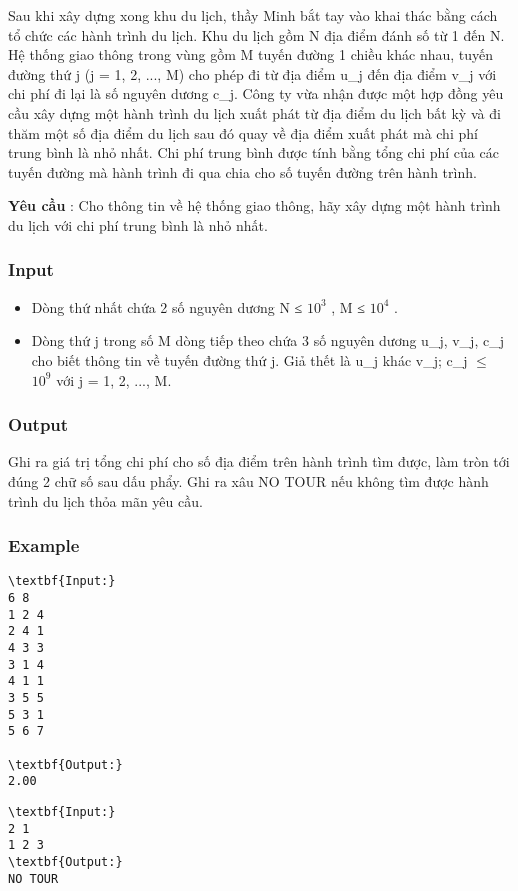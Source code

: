 



   Sau khi xây dựng xong khu du lịch, thầy Minh bắt tay vào khai thác bằng cách tổ chức các hành trình du lịch. Khu du lịch gồm N địa điểm đánh số từ 1 đến N. Hệ thống giao thông trong vùng gồm M tuyến đường 1 chiều khác nhau, tuyến đường thứ j (j = 1, 2, ..., M) cho phép đi từ địa điểm u\_j đến địa điểm v\_j với chi phí đi lại là số nguyên dương c\_j. Công ty vừa nhận được một hợp đồng yêu cầu xây dựng một hành trình du lịch xuất phát từ địa điểm du lịch bất kỳ và đi thăm một số địa điểm du lịch sau đó quay về địa điểm xuất phát mà chi phí trung bình là nhỏ nhất. Chi phí trung bình được tính bằng tổng chi phí của các tuyến đường mà hành trình đi qua chia cho số tuyến đường trên hành trình.  

\textbf{    Yêu cầu   }   : Cho thông tin về hệ thống giao thông, hãy xây dựng một hành trình du lịch với chi phí trung bình là nhỏ nhất.  

\subsubsection{   Input  }
\begin{itemize}
	\item     Dòng thứ nhất chứa 2 số nguyên dương N ≤ $10^{3}$    , M         ≤ $10^{4}$     .    
	\item      Dòng thứ j trong số M dòng tiếp theo chứa 3 số nguyên dương u\_j, v\_j, c\_j cho biết thông tin về tuyến đường thứ j. Giả thết là u\_j khác v\_j; c\_j  $\le$  $10^{9}$     với j = 1, 2, ..., M.    
\end{itemize}

\subsubsection{   Output  }

   Ghi ra giá trị tổng chi phí cho số địa điểm trên hành trình tìm được, làm tròn tới đúng 2 chữ số sau dấu phẩy. Ghi ra xâu NO TOUR nếu không tìm được hành trình du lịch thỏa mãn yêu cầu.  

\subsubsection{   Example  }
\begin{verbatim}
\textbf{Input:}
6 8
1 2 4 
2 4 1 
4 3 3 
3 1 4 
4 1 1 
3 5 5 
5 3 1 
5 6 7

\textbf{Output:}
2.00
\end{verbatim}


\begin{verbatim}
\textbf{Input:}
2 1
1 2 3
\textbf{Output:}
NO TOUR
\end{verbatim}
